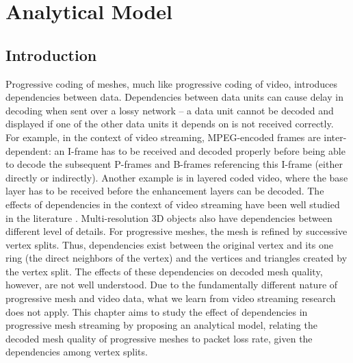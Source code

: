 \chapter{Analytical Model}
\label{c:model}
\def\tracea{UDP-High_result}
\def\traceb{UDP-Low_result}
\def\tracec{DCCP_result}
\def\mesha{Happy}
\def\meshb{Horse}
\def\meshc{Thai}
\def\mesh_h{Happy2}

\section{Introduction}
\label{s:model:intro}
    Progressive coding of meshes, much like progressive coding of
    video, introduces dependencies between data.
    Dependencies between data units can cause delay in decoding
    when sent over a lossy network -- a data unit
    cannot be decoded and displayed if one of the other data units
    it depends on is not received correctly. For example, in the
    context of video streaming, MPEG-encoded frames are inter-dependent:
        an I-frame has to be received and decoded properly
    before being able to decode the subsequent P-frames and B-frames
        referencing this I-frame (either directly or indirectly).  Another
    example is in layered coded video, where the base layer has
    to be received before the enhancement layers can be decoded.
    The effects of dependencies in the context of video streaming
    have been well studied in the literature \cite{boyce98}.   Multi-resolution 3D
    objects also have dependencies between different level of details.
        For progressive meshes, the mesh is refined by successive
    vertex splits. %
    Thus, dependencies exist between the original vertex and its one
    ring (the direct neighbors of the vertex)
    and the vertices and triangles created by the vertex split.
    The effects of these dependencies on decoded mesh quality, however,
    are not well understood.  Due to the fundamentally different
    nature of progressive mesh and video data, what we learn from
    video streaming research does not apply.  This chapter aims to study
    the effect of dependencies in progressive mesh streaming by
    proposing an analytical model, relating the decoded mesh quality
    of progressive meshes to packet loss rate, given the dependencies
    among vertex splits.

